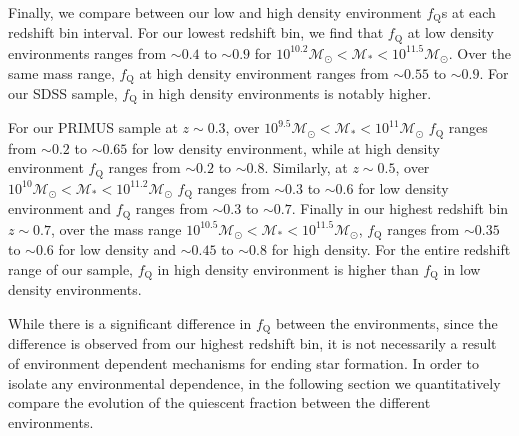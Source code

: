 \documentclass{aastex}
\begin{document}

Finally, we compare between our low and high density environment
$f_{\mathrm{Q}}$s at each redshift bin interval. For our lowest redshift
bin, we find that $f_{\mathrm{Q}}$ at low density environments ranges from
$\sim 0.4$ to $\sim 0.9$ for $10^{10.2} \mathcal{M}_{\odot} <
\mathcal{M}_{*} < 10^{11.5} \mathcal{M}_{\odot}$. Over the same mass
range, $f_{\mathrm{Q}}$ at high density environment ranges from $\sim
0.55$ to $\sim 0.9$. For our SDSS sample, $f_{\mathrm{Q}}$ in
high density environments is notably higher. 

For our PRIMUS sample at $z \sim 0.3$, over $10^{9.5} \mathcal{M}_{\odot} < \mathcal{M}_{*} < 10^{11} \mathcal{M}_{\odot}$ $f_{\mathrm{Q}}$ ranges from $\sim 0.2$ to $\sim 0.65$ for low density environment, while at high density environment $f_{\mathrm{Q}}$ ranges from $\sim 0.2$ to $\sim 0.8$. Similarly, at $z \sim 0.5$, over $10^{10} \mathcal{M}_{\odot} < \mathcal{M}_{*} < 10^{11.2} \mathcal{M}_{\odot}$ $f_{\mathrm{Q}}$ ranges from $\sim 0.3$ to $\sim 0.6$ for low density environment and $f_{\mathrm{Q}}$ ranges from $\sim 0.3$ to $\sim 0.7$. Finally in our highest redshift bin $z \sim 0.7$, over the mass range $10^{10.5} \mathcal{M}_{\odot} < \mathcal{M}_{*} < 10^{11.5} \mathcal{M}_{\odot}$, $f_{\mathrm{Q}}$ ranges from $\sim 0.35$ to $\sim 0.6$ for low density and $\sim 0.45$ to $\sim 0.8$ for high density. For the entire redshift range of our sample, $f_{\mathrm{Q}}$ in high density environment is higher than $f_{\mathrm{Q}}$ in low density environments. 

While there is a significant difference in $f_{\mathrm{Q}}$ between the
environments, since the difference is observed from our highest
redshift bin, it is not necessarily a result of environment dependent
mechanisms for ending star formation. In order to isolate any
environmental dependence, in the following section we quantitatively
compare the evolution of the quiescent fraction between the different
environments.
\end{document}
